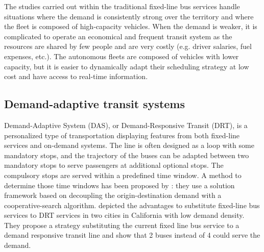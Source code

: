 \documentclass[12pt,a4paper]{article}
\begin{document}
The studies carried out within the traditional fixed-line bus services handle situations where the demand is consistently strong over the territory and where the fleet is composed of high-capacity vehicles. When the demand is weaker, it is complicated to operate an economical and frequent transit system as the resources are shared by few people and are very costly (e.g. driver salaries, fuel expenses, etc.). The autonomous fleets are composed of vehicles with lower capacity, but it is easier to dynamically adapt their scheduling strategy at low cost and have access to real-time information.

\subsection{Demand-adaptive transit systems}\label{das}
Demand-Adaptive System (DAS), or Demand-Responsive Transit (DRT), is a personalized type of transportation displaying features from both fixed-line services and on-demand systems. The line is often designed as a loop with some mandatory stops, and the trajectory of the buses can be adapted between two mandatory stops to serve passengers at additional optional stops. The compulsory stops are served within a predefined time window. A method to determine those time windows has been proposed by \cite{masterschedule}: they use a  solution framework based on decoupling the origin-destination demand with a cooperative-search algorithm. \cite{dasdesign} depicted the advantages to substitute fixed-line bus services to DRT services in two cities in California with low demand density. They propose a strategy substituting the current fixed line bus service to a demand responsive transit line and show that 2 buses instead of 4 could serve the demand. 
\end{document}

